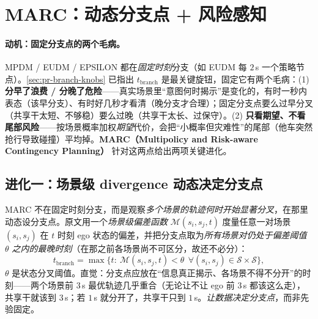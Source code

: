 \section{MARC：动态分支点 + 风险感知}
\label{sec:pr-marc}

\paragraph{动机：固定分支点的两个毛病。}
MPDM / EUDM / EPSILON 都在\emph{固定时刻}分支（如 EUDM 每 $2\,$s 一个策略节点）。\cref{sec:pr-branch-knobs} 已指出 $t_{\mathrm{branch}}$ 是最关键旋钮，固定它有两个毛病\cite{li2023marc}：(1) \textbf{分早了浪费 / 分晚了危险}——真实场景里“意图何时揭示”是变化的，有时一秒内表态（该早分支）、有时好几秒才看清（晚分支才合理）；固定分支点要么过早分叉（共享干太短、不够稳）要么过晚（共享干太长、过保守）。(2) \textbf{只看期望、不看尾部风险}——按场景概率加权\emph{期望}代价，会把“小概率但灾难性”的尾部（他车突然抢行导致碰撞）平均掉。\textbf{MARC（Multipolicy and Risk-aware Contingency Planning）}\cite{li2023marc} 针对这两点给出两项关键进化。

\subsection{进化一：场景级 divergence 动态决定分支点}
\label{sec:pr-marc-branch}

MARC 不在固定时刻分支，而是观察\emph{多个场景的轨迹何时开始显著分叉}，在那里动态设分支点。原文用一个\emph{场景级偏差函数} $\mathcal{M}(s_i,s_j,t)$ 度量任意一对场景 $(s_i,s_j)$ 在 $t$ 时刻 ego 状态的偏差，并把分支点取为\emph{所有场景对仍处于偏差阈值 $\theta$ 之内的最晚时刻}（在那之前各场景尚不可区分，故还不必分）：
\begin{equation}
  t_{\mathrm{branch}}=\max\Big\{t:\ \mathcal{M}(s_i,s_j,t)<\theta\ \ \forall (s_i,s_j)\in\mathcal{S}\times\mathcal{S}\Big\},
  \label{eq:pr-marc-tbranch}
\end{equation}
$\theta$ 是状态分叉阈值。直觉：分支点应放在“信息真正揭示、各场景不得不分开”的时刻——两个场景前 $3\,$s 最优轨迹几乎重合（无论让不让 ego 前 $3\,$s 都该这么走），共享干就该到 $3\,$s；若 $1\,$s 就分开了，共享干只到 $1\,$s。\emph{让数据决定分支点}，而非先验固定。

